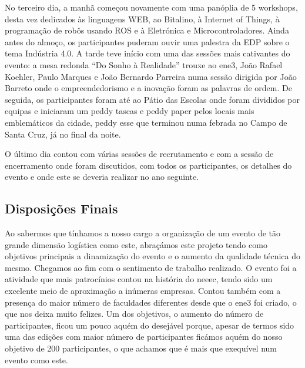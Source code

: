 No terceiro dia, a manhã começou novamente com uma panóplia de 5 workshops, desta vez dedicados às linguagens WEB, ao Bitalino, à Internet of Things, à programação de robôs usando ROS e à Eletrónica e Microcontroladores. Ainda antes do almoço, os participantes puderam ouvir uma palestra da EDP sobre o tema Indústria 4.0. A tarde teve início com uma das sessões mais cativantes do evento: a mesa redonda “Do Sonho à Realidade” trouxe ao \acrshort{ene3}, João Rafael Koehler, Paulo Marques e João Bernardo Parreira numa sessão dirigida por João Barreto onde o empreendedorismo e a inovação foram as palavras de ordem. De seguida, os participantes foram até ao Pátio das Escolas onde foram divididos por equipas e iniciaram um peddy tascas e peddy paper pelos locais mais emblemáticos da cidade, peddy esse que terminou numa febrada no Campo de Santa Cruz, já no final da noite.

O último dia contou com várias sessões de recrutamento e com a sessão de encerramento onde foram discutidos, com todos os participantes, os detalhes do evento e onde este se deveria realizar no ano seguinte.

\subsection{Disposições Finais}

Ao sabermos que tínhamos a nosso cargo a organização de um evento de tão grande dimensão logística como este, abraçámos este projeto tendo como objetivos principais a dinamização do evento e o aumento da qualidade técnica do mesmo. Chegamos ao fim com o sentimento de trabalho realizado. O evento foi a atividade que mais patrocínios contou na história do \acrshort{neeec}, tendo sido um excelente meio de aproximação a inúmeras empresas. Contou também com a presença do maior número de faculdades diferentes desde que o \acrshort{ene3} foi criado, o que nos deixa muito felizes. Um dos objetivos, o aumento do número de participantes, ficou um pouco aquém do desejável porque, apesar de termos sido uma das edições com maior número de participantes ficámos aquém do nosso objetivo de 200 participantes, o que achamos que é mais que exequível num evento como este.
